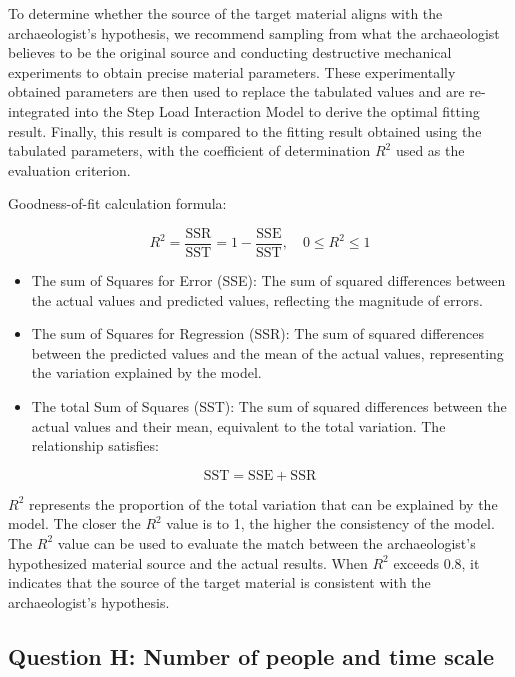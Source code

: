 \documentclass{mcmthesis}
\begin{document}
To determine whether the source of the target material aligns with the archaeologist's hypothesis, we recommend sampling from what the archaeologist believes to be the original source and conducting destructive mechanical experiments to obtain precise material parameters. These experimentally obtained parameters are then used to replace the tabulated values and are re-integrated into the Step Load Interaction Model to derive the optimal fitting result. Finally, this result is compared to the fitting result obtained using the tabulated parameters, with the coefficient of determination $R^2$ used as the evaluation criterion.


Goodness-of-fit calculation formula:


\[R^2 = \frac{\text{SSR}}{\text{SST}} = 1 - \frac{\text{SSE}}{\text{SST}}, \quad 0 \leq R^2 \leq 1 \]

\begin{itemize} 

\item The sum of Squares for Error (SSE): The sum of squared differences between the actual values and predicted values, reflecting the magnitude of errors. 

\item The sum of Squares for Regression (SSR): The sum of squared differences between the predicted values and the mean of the actual values, representing the variation explained by the model. 

\item The total Sum of Squares (SST): The sum of squared differences between the actual values and their mean, equivalent to the total variation. The relationship satisfies: 
\end{itemize}



\[\text{SST} = \text{SSE} + \text{SSR}\]

$R^2$ represents the proportion of the total variation that can be explained by the model. The closer the $R^2$ value is to 1, the higher the consistency of the model. The $R^2$ value can be used to evaluate the match between the archaeologist's hypothesized material source and the actual results. When $R^2$ exceeds 0.8, it indicates that the source of the target material is consistent with the archaeologist's hypothesis.


\subsection{Question H: Number of people and time scale}
\end{document}
